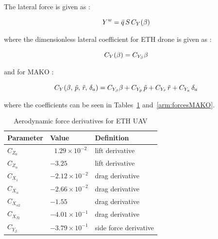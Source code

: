 The lateral force is given as :

\begin{equation}{\label{eqn:lateralForceETHcraft}}
Y^w = \bar{q} \, S \,  C_Y(\beta)
\end{equation}

where the dimensionless lateral coefficient for ETH drone is given as :

\begin{equation}{\label{eqn:lateralCoeffETHcraft}}
C_Y(\beta) = C_{Y_\beta} \beta
\end{equation}

and for MAKO :

\begin{equation}{\label{eqn:lateralCoeffMAKO}}
C_Y(\beta, \, \tilde{p}, \, \tilde{r}, \, \delta_a) = C_{Y_\beta} \beta + C_{Y_{\tilde{p}}} \, \tilde{p} + C_{Y_{\tilde{r}}} \, \tilde{r} + C_{Y_a} \, \delta_a 
\end{equation}

where the coefficients can be seen in Tables~\ref{arm:forcesETHcraft} and~\ref{arm:forcesMAKO}.

\begin{table}
\caption{Aerodynamic force derivatives for ETH UAV \cite{ducard2009fault}}
\label{arm:forcesETHcraft}
\begin{center}
\begin{tabular}{ ||p{3cm}|p{3cm}|p{4cm}||}\hline
\textbf{Parameter} & \textbf{Value} & \textbf{Definition} \\\hline
$C_{Z_0}$                             & $\ \ \,1.29 \times 10^{-2}$	   & lift derivative \\\hline
$C_{Z_{\alpha}}$                   & $-3.25 $                                 & lift derivative \\\hline
$C_{X_1}$                             & $-2.12 \times 10^{-2}$	   & drag derivative \\\hline
$C_{X_{\alpha}}$                   & $-2.66 \times 10^{-2}$          & drag derivative \\\hline
$C_{X_{\alpha 2}}$                & $-1.55 $	                            & drag derivative \\\hline
$C_{X_{\beta 2}} $                 & $-4.01 \times 10^{-1}$	   & drag derivative \\\hline
$C_{Y_\beta} $                      & $-3.79 \times 10^{-1}$          & side force derivative \\\hline
\end{tabular}
\end{center}
\end{table}


